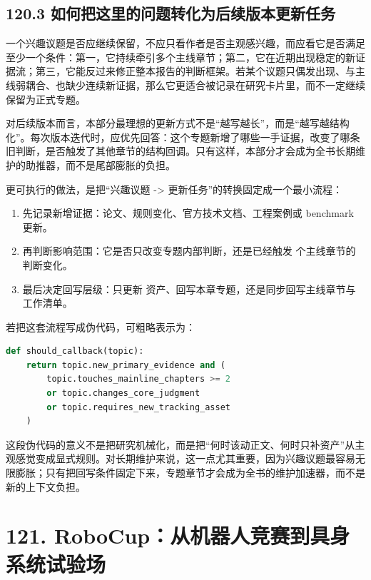 \subsection*{120.3 如何把这里的问题转化为后续版本更新任务}


一个兴趣议题是否应继续保留，不应只看作者是否主观感兴趣，而应看它是否满足至少一个条件：第一，它持续牵引多个主线章节；第二，它在近期出现稳定的新证据流；第三，它能反过来修正整本报告的判断框架。若某个议题只偶发出现、与主线弱耦合、也缺少连续新证据，那么它更适合被记录在研究卡片里，而不一定继续保留为正式专题。

对后续版本而言，本部分最理想的更新方式不是“越写越长”，而是“越写越结构化”。每次版本迭代时，应优先回答：这个专题新增了哪些一手证据，改变了哪条旧判断，是否触发了其他章节的结构回调。只有这样，本部分才会成为全书长期维护的助推器，而不是尾部膨胀的负担。

更可执行的做法，是把“兴趣议题 -> 更新任务”的转换固定成一个最小流程：

\begin{enumerate}
\item 先记录新增证据：论文、规则变化、官方技术文档、工程案例或 benchmark 更新。
\item 再判断影响范围：它是否只改变专题内部判断，还是已经触发 \texttt{} 个主线章节的判断变化。
\item 最后决定回写层级：只更新  资产、回写本章专题，还是同步回写主线章节与工作清单。
\end{enumerate}

若把这套流程写成伪代码，可粗略表示为：

\begin{lstlisting}[language=python]
def should_callback(topic):
    return topic.new_primary_evidence and (
        topic.touches_mainline_chapters >= 2
        or topic.changes_core_judgment
        or topic.requires_new_tracking_asset
    )
\end{lstlisting}

这段伪代码的意义不是把研究机械化，而是把“何时该动正文、何时只补资产”从主观感觉变成显式规则。对长期维护来说，这一点尤其重要，因为兴趣议题最容易无限膨胀；只有把回写条件固定下来，专题章节才会成为全书的维护加速器，而不是新的上下文负担。

\section*{121. RoboCup：从机器人竞赛到具身系统试验场}

